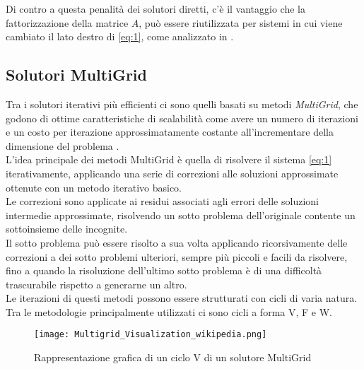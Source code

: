 Di contro a questa penalità dei solutori diretti, c'è il vantaggio che la fattorizzazione della matrice $A$, 
può essere riutilizzata per sistemi in cui viene cambiato il lato destro di \ref{eq:1},
come analizzato in \cite{sparseLinearSolverTR}.\\
\voidLine
\subsection{Solutori MultiGrid} \label{multiGrid}
Tra i solutori iterativi più efficienti ci sono quelli basati su metodi \emph{MultiGrid}, 
che godono di ottime caratteristiche di scalabilità come avere un numero di iterazioni e 
un costo per iterazione approssimatamente costante all'incrementare della dimensione del problema \cite{AMGgeneralANY,Sp3MM4AMG}.\\
L'idea principale dei metodi MultiGrid è quella di 
risolvere il sistema \ref{eq:1} iterativamente, applicando una serie di correzioni 
alle soluzioni approssimate ottenute con un metodo iterativo basico.\\
Le correzioni sono applicate ai residui associati agli errori delle soluzioni intermedie approssimate,
risolvendo un sotto problema dell'originale contente un sottoinsieme delle incognite.\\ %
Il sotto problema può essere risolto a sua volta applicando ricorsivamente delle correzioni
a dei sotto problemi ulteriori, sempre più piccoli e facili da risolvere,
fino a quando la risoluzione dell'ultimo sotto problema è di una difficoltà trascurabile 
rispetto a generarne un altro.\\
\voidLine
Le iterazioni di questi metodi possono essere strutturati con cicli di varia natura.
Tra le metodologie principalmente utilizzati ci sono cicli a forma V, F e W.\\
\begin{figure}[H]
  \centering \texttt{[image: Multigrid\_Visualization\_wikipedia.png]}
  \caption[ciclo V di un Multigrid] {Rappresentazione grafica di un ciclo V di un solutore MultiGrid}
  \decoRule \label{fig:Multigrid_Visualization_wikipedia}
\end{figure}

